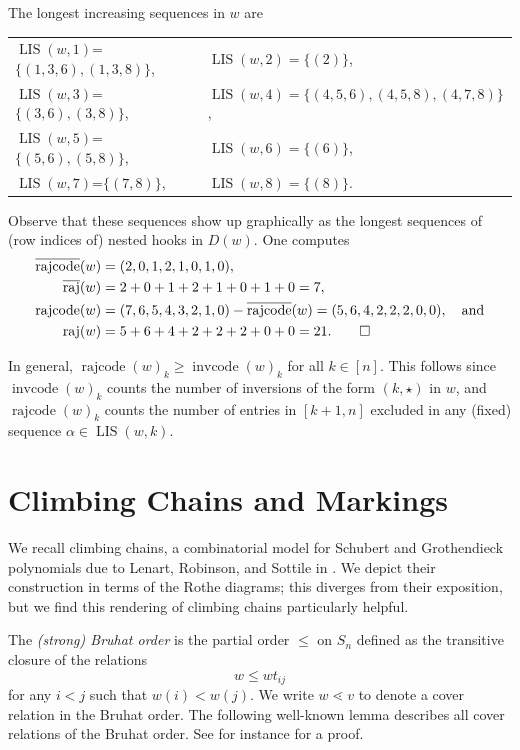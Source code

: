 \documentclass[11pt]{amsart}
\theoremstyle{definition}
\newenvironment{example}
{\pushQED{\qed}\renewcommand{\qedsymbol}{$\diamondsuit$}\examplex}
{\popQED\endexamplex}
\theoremstyle{named}
\DeclareMathOperator{\cc}{\mathrm{invcode}} %
\DeclareMathOperator{\rr}{\mathrm{rajcode}} %
\newcommand{\orr}{\overline{\rr}} %
\newcommand{\absrajcode}[1]{\mathrm{raj}(#1)}
\newcommand{\absoverrajcode}[1]{\overline{\mathrm{raj}}(#1)}
\DeclareMathOperator{\LIS}{\mathrm{LIS}}
\begin{document}
\begin{example}
\begin{center}
		\end{center}
		The longest increasing sequences in $w$ are
		\begin{center}
			\begin{tabular}{lcl}
				$\LIS(w,1)$=$\{(1, 3, 6),(1, 3, 8) \}$,&\phantom{aaaa}&$\LIS(w,2)=\{(2)\}$,\\
				$\LIS(w,3)$=$\{(3, 6),(3, 8)\}$,&\phantom{aaaa}&$\LIS(w,4)=\{(4, 5, 6),(4, 5, 8),(4, 7, 8)\}$,\\
				$\LIS(w,5)$=$\{(5, 6),(5, 8)\}$,&\phantom{aaaa}&$\LIS(w,6)=\{(6)\}$,\\
				$\LIS(w,7)$=$\{(7,8)\}$,&\phantom{aaaa}&$\LIS(w,8)=\{(8)\}$.
			\end{tabular}
		\end{center}
	Observe that these sequences show up graphically as the longest sequences of (row indices of) nested hooks in $D(w)$.
	One computes
	\begin{align*}
		\orr(w)&=(2,0,1,2,1,0,1,0),\\
		\absoverrajcode{w} &= 2+0+1+2+1+0+1+0 = 7,\\
		\rr(w) &= (7,6,5,4,3,2,1,0)-\orr(w)=(5, 6, 4, 2, 2, 2, 0, 0),\quad \mbox{and}\\
		\absrajcode{w}&=5+6+4+2+2+2+0+0 = 21.\qedhere
	\end{align*}
	\end{example}

	In general, $\rr(w)_k\geq \cc(w)_k$ for all $k\in [n]$. This follows since $\cc(w)_k$ counts the number of inversions of the form $(k,\star)$ in $w$, and $\rr(w)_k$ counts the number of entries in $[k+1,n]$ excluded in any (fixed) sequence $\alpha\in \LIS(w,k)$.
	
	\section{Climbing Chains and Markings} 
	\label{sec:climb}
	
	We recall climbing chains, a combinatorial model for Schubert and Grothendieck polynomials due to Lenart, Robinson, and Sottile in \cite{LRS}. We depict their construction in terms of the Rothe diagrams; this diverges from their exposition, but we find this rendering of climbing chains particularly helpful. 
	
	The \emph{(strong) Bruhat order} is the partial order $\leq$ on $S_n$ defined as the transitive closure of the relations 
	\[w\leq wt_{ij} \]
	for any $i<j$ such that $w(i)<w(j)$.
	We write $w\lessdot v$ to denote a cover relation in the Bruhat order. The following well-known lemma describes all cover relations of the Bruhat order. See for instance \cite[Lemma 2.1.4]{combcoxgroups} for a proof.
	
\end{document}
